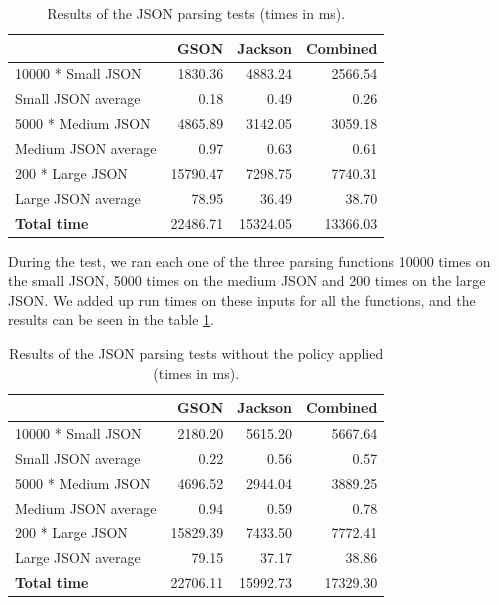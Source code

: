 \begin{table}[h!]
	\captionsetup{justification=centering,margin=0.5cm}
	\bgroup
	\def\arraystretch{1.5}%
	\begin{center}
		\begin{tabular}{ | l | r | r | r | }
			\hline
			& \textbf{GSON} & \textbf{Jackson} & \textbf{Combined} \\ \hline
			10000 * Small JSON & 1830.36 & 4883.24 & 2566.54 \\ \hline	
			Small JSON average & 0.18 & 0.49 & 0.26 \\ \hline	
			5000 * Medium JSON & 4865.89 & 3142.05 & 3059.18 \\ \hline	
			Medium JSON average & 0.97 & 0.63 & 0.61 \\ \hline	
			200 * Large JSON & 15790.47 & 7298.75 & 7740.31 \\ \hline	
			Large JSON average & 78.95 & 36.49 & 38.70 \\ \hline
			\textbf{Total time} & 22486.71 & 15324.05 & 13366.03 \\
			\hline
		\end{tabular}
	\end{center}
	\egroup
	\caption{Results of the JSON parsing tests (times in ms).}
	\label{tab:json_parsing_results}
\end{table}


During the test, we ran each one of the three parsing functions 10000 times on the small JSON, 5000 times on the medium JSON and 200 times on the large JSON. We added up run times on these inputs for all the functions, and the results can be seen in the table \ref{tab:json_parsing_results}.

\begin{table}[h!]
	\captionsetup{justification=centering,margin=0.5cm}
	\bgroup
	\def\arraystretch{1.5}%
	\begin{center}
		\begin{tabular}{ | l | r | r | r | }
			\hline
			& \textbf{GSON} & \textbf{Jackson} & \textbf{Combined} \\ \hline
			10000 * Small JSON  & 2180.20       & 5615.20          & 5667.64           \\ \hline
			Small JSON average  & 0.22          & 0.56             & 0.57              \\ \hline
			5000 * Medium JSON  & 4696.52       & 2944.04          & 3889.25           \\ \hline
			Medium JSON average & 0.94          & 0.59             & 0.78              \\ \hline
			200 * Large JSON    & 15829.39      & 7433.50          & 7772.41           \\ \hline
			Large JSON average  & 79.15         & 37.17            & 38.86             \\ \hline
			\textbf{Total time}          & 22706.11      & 15992.73         & 17329.30          \\ \hline
		\end{tabular}
	\end{center}
	\egroup
	\caption{Results of the JSON parsing tests without the policy applied (times in ms).}
	\label{tab:json_parsing_results_no_policy}
\end{table}

